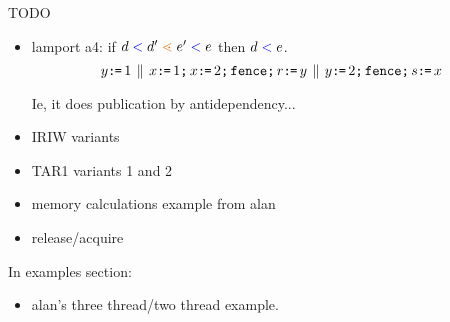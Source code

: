 TODO
\begin{itemize}  
\item lamport a4:
  if $\bEv\lt\bEv'\geN\aEv'\lt\aEv$ then $d\mathrel{{\color{blue}<}}e$.
  \begin{displaymath}
    y\texttt{:}\mkern-1mu\texttt{=}\, 1
    \,\mathbin{\|}\,
    x\texttt{:}\mkern-1mu\texttt{=}\, 1\texttt{;}\,
    x\texttt{:}\mkern-1mu\texttt{=}\, 2\texttt{;}\,
    \texttt{fence}\texttt{;}\,
    r\texttt{:}\mkern-1mu\texttt{=}\, y
    \,\mathbin{\|}\,
    y\texttt{:}\mkern-1mu\texttt{=}\, 2\texttt{;}\,
    \texttt{fence}\texttt{;}\,
    s\texttt{:}\mkern-1mu\texttt{=}\, x
  \end{displaymath}
\begin{tikzdisplay}[node distance=1em]
\end{tikzdisplay}
Ie, it does publication by antidependency...

\item IRIW variants
\item TAR1 variants 1 and 2
\item memory calculations example from alan
\item release/acquire
\end{itemize}

In examples section:
\begin{itemize}
\item alan's three thread/two thread example.
\end{itemize}


